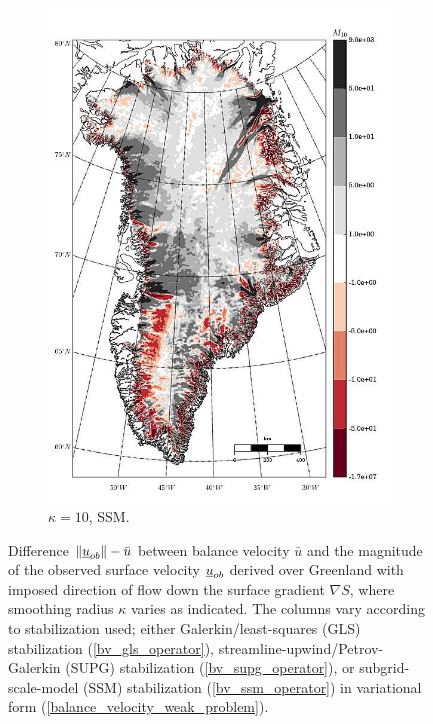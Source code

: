 \begin{figure}
\begin{subfigure}[b]{0.25\linewidth}
    \includegraphics[width=\linewidth]{images/balance_velocity/greenland/misfit_5H_kappa_10_SSM.jpg}
  \caption{$\kappa = 10$, SSM.}
  \label{greenland_bv_image_kappa_10_SSM_misfit}
  \end{subfigure}
 
  \caption[Greenland balance-velocity misfit with $\mathbf{d}^{\text{data}} = -\nabla S$.]{Difference $\Vert \underline{u}_{ob} \Vert - \bar{u}$ between balance velocity $\bar{u}$ and the magnitude of the observed surface velocity $\underline{u}_{ob}$ derived over Greenland with imposed direction of flow down the surface gradient $\nabla S$, where smoothing radius $\kappa$ varies as indicated.  The columns vary according to stabilization used; either Galerkin/least-squares (GLS) stabilization (\ref{bv_gls_operator}), streamline-upwind/Petrov-Galerkin (SUPG) stabilization (\ref{bv_supg_operator}), or subgrid-scale-model (SSM) stabilization (\ref{bv_ssm_operator}) in variational form (\ref{balance_velocity_weak_problem}).}

  \label{greenland_bv_image_misfit}

\end{figure}


